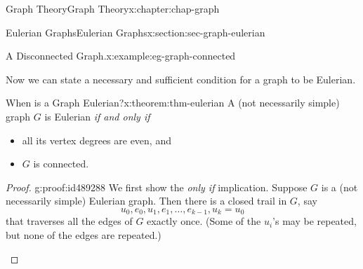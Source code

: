 \documentclass[oneside,10pt,]{book}
\numberwithin{equation}{section}
\begin{document}
\begin{chapterptx}{Graph Theory}{}{Graph Theory}{}{}{x:chapter:chap-graph}
\begin{sectionptx}{Eulerian Graphs}{}{Eulerian Graphs}{}{}{x:section:sec-graph-eulerian}
\begin{example}{A Disconnected Graph.}{x:example:eg-graph-connected}
\begin{sidebyside}{1}{0.415}{0.415}{0}
\begin{sbspanel}{0.17}
{
}%
\end{sbspanel}%
\end{sidebyside}%
\end{example}
Now we can state a necessary and sufficient condition for a graph to be Eulerian.%
\begin{theorem}{When is a Graph Eulerian?}{}{x:theorem:thm-eulerian}%
A (not necessarily simple) graph \(G\) is Eulerian \emph{if and only if}%
\begin{itemize}[label=\textbullet]
\item{}all its vertex degrees are even, and%
\item{}\(G\) is connected.%
\end{itemize}
%
\end{theorem}
\begin{proof}{}{g:proof:id489288}
We first show the \emph{only if} implication. Suppose \(G\) is a (not necessarily simple) Eulerian graph. Then there is a closed trail in \(G\), say%
\begin{equation*}
u_0, e_0, u_1, e_1, \ldots, e_{k-1}, u_k = u_0
\end{equation*}
that traverses all the edges of \(G\) exactly once. (Some of the \(u_i\)'s may be repeated, but none of the edges are repeated.)%
\begin{sidebyside}{1}{0.275}{0.275}{0}%
\begin{sbspanel}{0.45}%
\resizebox{\linewidth}{!}{%
			\begin{tikzpicture}[scale=0.7]

\end{tikzpicture}}
\end{sbspanel}
\end{sidebyside}
\end{proof}
\end{sectionptx}
\end{chapterptx}
\end{document}
